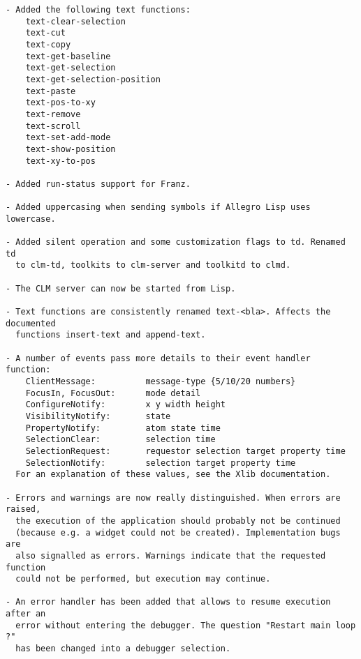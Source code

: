 \begin{verbatim}
- Added the following text functions:
    text-clear-selection
    text-cut
    text-copy
    text-get-baseline
    text-get-selection
    text-get-selection-position
    text-paste
    text-pos-to-xy
    text-remove
    text-scroll
    text-set-add-mode
    text-show-position
    text-xy-to-pos

- Added run-status support for Franz.

- Added uppercasing when sending symbols if Allegro Lisp uses lowercase.

- Added silent operation and some customization flags to td. Renamed td
  to clm-td, toolkits to clm-server and toolkitd to clmd.

- The CLM server can now be started from Lisp.

- Text functions are consistently renamed text-<bla>. Affects the documented
  functions insert-text and append-text.

- A number of events pass more details to their event handler function:
    ClientMessage:          message-type {5/10/20 numbers}
    FocusIn, FocusOut:      mode detail
    ConfigureNotify:        x y width height
    VisibilityNotify:       state
    PropertyNotify:         atom state time
    SelectionClear:         selection time
    SelectionRequest:       requestor selection target property time
    SelectionNotify:        selection target property time
  For an explanation of these values, see the Xlib documentation.

- Errors and warnings are now really distinguished. When errors are raised,
  the execution of the application should probably not be continued
  (because e.g. a widget could not be created). Implementation bugs are
  also signalled as errors. Warnings indicate that the requested function
  could not be performed, but execution may continue.

- An error handler has been added that allows to resume execution after an
  error without entering the debugger. The question "Restart main loop ?"
  has been changed into a debugger selection.\end{verbatim}
\normalsize
\nocite{motif-uil}
\nocite{motif-style-guide}


\printindex

